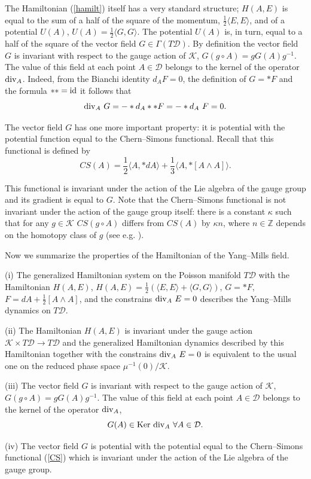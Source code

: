 \documentclass{amsart}
\begin{document}
The Hamiltonian (\ref{hamilt}) itself has a very standard structure; $H(A,E)$ is
equal to the sum of a half of the square of the momentum, $\frac 12
\langle E,E\rangle $, and of a potential $U(A)$, $U(A)=\frac 12 \langle G,G\rangle $. The potential $U(A)$ is, in
turn, equal to a half of the square of the vector field $G\in
\Gamma(T\mathcal{D})$. By definition the vector field $G$ is invariant with respect
to the gauge action of $\mathcal{K}$, $G(g\circ A)=gG(A)g^{-1}$.
The value of this field at each point $A\in \mathcal{D}$
belongs to the kernel of the operator ${\rm div}_A$.
Indeed, from the Bianchi identity
$d_AF=0$, the definition
of $G=*F$ and the formula $**={\rm id}$ it follows that
$$
{\rm div}_A~G=-*d_A**F=-*d_A~F=0.
$$

The vector field $G$ has one more important property: it is potential with the potential function equal to the Chern--Simons functional. Recall that this functional is defined by
\begin{equation}\label{CS}
CS(A)=\frac{1}{2}\langle A,*dA\rangle +\frac{1}{3}\langle A,*[A\wedge A]\rangle .	
\end{equation}

This functional is invariant under the action of the Lie algebra of the gauge group and its gradient is equal to $G$. Note that the Chern--Simons functional is not invariant under the action of the gauge group itself: there is a constant $\kappa$ such that for any $g \in \mathcal{K}$ $CS(g\circ A)$ differs from $CS(A)$ by $\kappa n$, where $n\in \mathbb{Z}$ depends on the homotopy class of $g$ (see e.g. \cite{F}).   


Now we summarize the properties of the Hamiltonian of the Yang--Mills field.
\begin{proposition}\label{YMhamiltprop}
(i) The generalized Hamiltonian system on the Poisson manifold $T\mathcal{D}$ with the
Hamiltonian $H(A,E)$,
$H(A,E)=\frac 12 (\langle E,E\rangle +\langle G,G\rangle )$, $G=*F$, $F=dA+\frac{1}{2}[A\wedge A]$, and the constrains
${\rm div}_A~E=0$
describes the Yang--Mills dynamics on $T\mathcal{D}$.

(ii) The Hamiltonian $H(A,E)$ is invariant under the gauge action
$\mathcal{K}\times T\mathcal{D}\rightarrow T\mathcal{D}$ and the generalized Hamiltonian
dynamics described by this Hamiltonian together with the constrains ${\rm div}_A~E=0$
is equivalent to the usual one on the reduced phase space
$\mu^{-1}(0)/\mathcal{K}$.

(iii) The vector field $G$ is invariant with respect
to the gauge action of $\mathcal{K}$, $G(g\circ A)=gG(A)g^{-1}$.
The value of this field at each point $A\in \mathcal{D}$
belongs to the kernel of the operator ${\rm div}_A$,
$$
G(A)\in {\rm Ker}~{\rm div}_A~\forall A\in \mathcal{D}.
$$

(iv) The vector field $G$ is potential with the potential equal to the Chern--Simons functional (\ref{CS}) which is invariant under the action of the Lie algebra of the gauge group.
\end{proposition}
\end{document}
